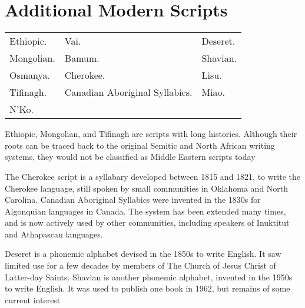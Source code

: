 \chapter{Additional Modern Scripts}

\begin{center}
\begin{tabular}{lp{5cm}l}
Ethiopic. &Vai. &Deseret.\\
Mongolian. &Bamum. &Shavian.\\
Osmanya.   &Cherokee. &Lisu.\\
Tifinagh.  &Canadian Aboriginal Syllabics. &Miao.\\
N’Ko.&&\\
\end{tabular}
\end{center}

Ethiopic, Mongolian, and Tifinagh are scripts with long histories. Although their roots can
be traced back to the original Semitic and North African writing systems, they would not
be classified as Middle Eastern scripts today

The Cherokee  script is a syllabary developed between 1815 and 1821, to write the Cherokee
language, still spoken by small communities in Oklahoma and North Carolina. Canadian
Aboriginal Syllabics were invented in the 1830s for Algonquian languages in Canada. The
system has been extended many times, and is now actively used by other communities, including speakers of Inuktitut and Athapascan languages.

Deseret is a phonemic alphabet devised in the 1850s to write English. It saw limited use for
a few decades by members of The Church of Jesus Christ of Latter-day Saints. Shavian is
another phonemic alphabet, invented in the 1950s to write English. It was used to publish
one book in 1962, but remains of some current interest















